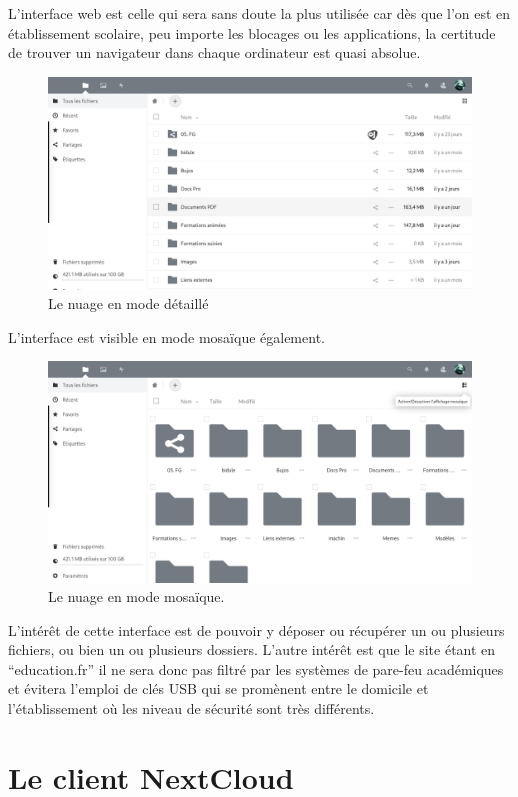 L'interface web est celle qui sera sans doute la plus utilisée car dès que l'on est en établissement scolaire, peu importe les blocages ou les applications, la certitude de trouver un navigateur dans chaque ordinateur est quasi absolue.
\begin{figure}
	\centering
	\includegraphics[width=\linewidth]{./Captures/nuage.accueil.png}
	\caption{Le nuage en mode détaillé}
\end{figure}
L'interface est visible en mode mosaïque également.
\begin{figure}
	\centering
	\includegraphics[width=\linewidth]{./Captures/nuage.accueil.mozaique.png}
	\caption{Le nuage en mode mosaïque.}
\end{figure}
L'intérêt de cette interface est de pouvoir y déposer ou récupérer un ou plusieurs fichiers, ou bien un ou plusieurs dossiers. 
L'autre intérêt est que le site étant en ``education.fr'' il ne sera donc pas filtré par les systèmes de pare-feu académiques et évitera l'emploi de clés USB qui se promènent entre le domicile et l'établissement où les niveau de sécurité sont très différents.

\section*{Le client NextCloud}

